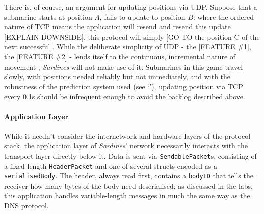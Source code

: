 \documentclass[a4paper, 9pt]{article}
\begin{document}
\begin{flushleft}
\vspace{5pt}\noindent
There is, of course, an argument for updating positions via UDP. Suppose that a submarine starts at position $A$, fails to update to position $B$: where the ordered nature of TCP means the application will resend and resend this update [EXPLAIN DOWNSIDE], this protocol will simply [GO TO the position C of the next successful].  While the deliberate simplicity of UDP - the [FEATURE \#1], the [FEATURE \#2] - lends itself to the continuous, incremental nature of movement , \textit{Sardines} will not make use of it. Submarines in this game travel slowly, with positions needed reliably but not immediately, and with the robustness of the prediction system used (see `'), updating position via TCP every 0.1s should be infrequent enough to avoid the backlog described above.

\paragraph{Application Layer} 

While it needn't consider the internetwork and hardware layers of the protocol stack, the application layer of \textit{Sardines}' network necessarily interacts with the transport layer directly below it. Data is sent via \texttt{SendablePacket}s, consisting of a fixed-length \texttt{HeaderPacket} and one of several structs encoded as a \texttt{serialisedBody}. The header, always read first, contains a \texttt{bodyID}  that tells the receiver how many bytes of the body need deserialised; as discussed in the labs, this application handles variable-length messages in much the same way as the DNS protocol.


\end{flushleft}
\end{document}
